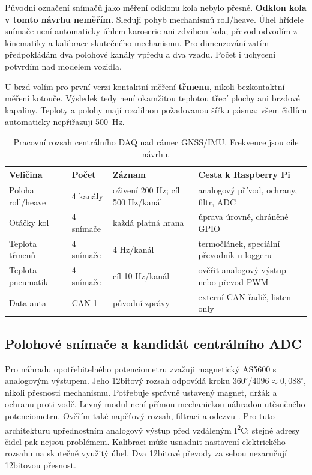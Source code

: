Původní označení snímačů jako měření odklonu kola nebylo přesné.
\textbf{Odklon kola v tomto návrhu neměřím.} Sleduji pohyb mechanismů
roll/heave. Úhel hřídele snímače není automaticky úhlem karoserie ani
zdvihem kola; převod odvodím z kinematiky a kalibrace skutečného mechanismu.
Pro dimenzování zatím předpokládám dva polohové kanály vpředu a dva vzadu.
Počet i uchycení potvrdím nad modelem vozidla.

U brzd volím pro první verzi kontaktní měření \textbf{třmenu}, nikoli
bezkontaktní měření kotouče. Výsledek tedy není okamžitou teplotou třecí
plochy ani brzdové kapaliny. Teploty a polohy mají rozdílnou požadovanou
šířku pásma; všem čidlům automaticky nepřiřazuji \SI{500}{Hz}.

\begin{table}[htbp]
\centering\small
\caption{Pracovní rozsah centrálního DAQ nad rámec GNSS/IMU. Frekvence jsou cíle návrhu.}
\label{tab:vozidlo-senzory}
\begin{tabularx}{\textwidth}{@{}L{29mm}L{16mm}L{32mm}Y@{}}
\toprule
Veličina & Počet & Záznam & Cesta k Raspberry Pi \\
\midrule
Poloha roll/heave & 4 kanály & oživení 200 Hz; cíl 500 Hz/kanál & analogový přívod, ochrany, filtr, ADC \\
Otáčky kol & 4 snímače & každá platná hrana & úprava úrovně, chráněné GPIO \\
Teplota třmenů & 4 snímače & 4 Hz/kanál & termočlánek, speciální převodník u loggeru \\
Teplota pneumatik & 4 snímače & cíl 10 Hz/kanál & ověřit analogový výstup nebo převod PWM \\
Data auta & CAN 1 & původní zprávy & externí CAN řadič, listen-only \\
\bottomrule
\end{tabularx}
\end{table}

\subsection{Polohové snímače a kandidát centrálního ADC}

Pro náhradu opotřebitelného potenciometru zvažuji magnetický AS5600
s analogovým výstupem. Jeho 12bitový rozsah odpovídá kroku
$360^{\circ}/4096\approx0{,}088^{\circ}$, nikoli přesnosti mechanismu.
Potřebuje správně ustavený magnet, držák a ochranu proti vodě. Levný
modul není přímou mechanickou náhradou utěsněného potenciometru.
Ověřím také napěťový rozsah, filtraci a odezvu \cite{as5600-integrace}.
Pro tuto architekturu upřednostním analogový výstup před vzdáleným
I\textsuperscript{2}C; stejné adresy čidel pak nejsou problémem.
Kalibraci může usnadnit nastavení elektrického rozsahu na skutečně
využitý úhel. Dva 12bitové převody za sebou nezaručují 12bitovou přesnost.


